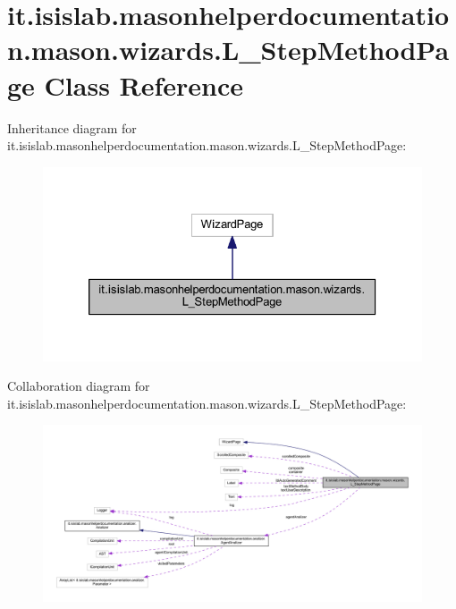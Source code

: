 \hypertarget{classit_1_1isislab_1_1masonhelperdocumentation_1_1mason_1_1wizards_1_1_l___step_method_page}{\section{it.\-isislab.\-masonhelperdocumentation.\-mason.\-wizards.\-L\-\_\-\-Step\-Method\-Page Class Reference}
\label{classit_1_1isislab_1_1masonhelperdocumentation_1_1mason_1_1wizards_1_1_l___step_method_page}
}


Inheritance diagram for it.\-isislab.\-masonhelperdocumentation.\-mason.\-wizards.\-L\-\_\-\-Step\-Method\-Page\-:\nopagebreak
\begin{figure}[H]
\begin{center}
\leavevmode
\includegraphics[width=326pt]{classit_1_1isislab_1_1masonhelperdocumentation_1_1mason_1_1wizards_1_1_l___step_method_page__inherit__graph}
\end{center}
\end{figure}


Collaboration diagram for it.\-isislab.\-masonhelperdocumentation.\-mason.\-wizards.\-L\-\_\-\-Step\-Method\-Page\-:\nopagebreak
\begin{figure}[H]
\begin{center}
\leavevmode
\includegraphics[width=350pt]{classit_1_1isislab_1_1masonhelperdocumentation_1_1mason_1_1wizards_1_1_l___step_method_page__coll__graph}
\end{center}
\end{figure}
